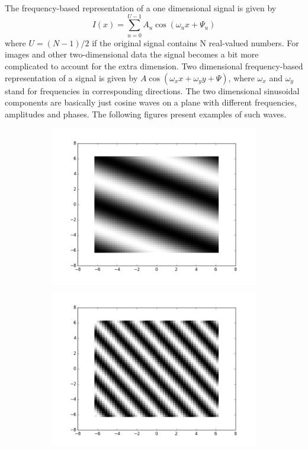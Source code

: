 \documentclass[]{article}
\begin{document}
The frequency-based representation of a one dimensional signal is given by
\begin{equation}
  I(x) = \sum_{u=0}^{U-1}{A_{u}\cos(\omega_{u}x+\Psi_{u})}
\end{equation}
where $U = (N-1)/2$ if the original signal contains N real-valued numbers. For
images and other two-dimensional data the signal becomes a bit more complicated
to account for the extra dimension. Two dimensional frequency-based
representation of a signal is given by $A \cos(\omega_{x} x + \omega_{y} y +
\Psi)$, where $\omega_{x}$ and $\omega_{y}$ stand for frequencies in
corresponding directions. The two dimensional sinusoidal components are
basically just cosine waves on a plane with different frequencies, amplitudes
and phases. The following figures present examples of such waves.
\begin{figure}
  \centering
    \begin{subfigure}[t]{0.49\textwidth}
      \centering
      \includegraphics[width=0.99\linewidth]{sinusoidal1.png}
    \end{subfigure}
    \begin{subfigure}[t]{0.49\textwidth}
      \centering
      \includegraphics[width=0.99\linewidth]{sinusoidal2.png}
    \end{subfigure}
\end{figure}
\end{document}
